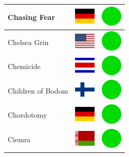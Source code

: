 \documentclass[12pt, a4paper, twoside]{report}
\begin{document}
\begin{center}
\begin{longtable}{|p{5cm}|p{2cm}|p{2cm}|}
 Chasing Fear                                               & \includegraphics[width=1cm]{../img/flags/de} &   \includegraphics[width=1cm]{../likes/y} \\ \hline
 Chelsea Grin                                               & \includegraphics[width=1cm]{../img/flags/us} &   \includegraphics[width=1cm]{../likes/y} \\ \hline
 Chemicide                                                  & \includegraphics[width=1cm]{../img/flags/cr} &   \includegraphics[width=1cm]{../likes/y} \\ \hline
 Children of Bodom                                          & \includegraphics[width=1cm]{../img/flags/fi} &   \includegraphics[width=1cm]{../likes/y} \\ \hline
 Chordotomy                                                 & \includegraphics[width=1cm]{../img/flags/de} &   \includegraphics[width=1cm]{../likes/y} \\ \hline
 Ciemra                                                     & \includegraphics[width=1cm]{../img/flags/by} &   \includegraphics[width=1cm]{../likes/y} \\ \hline

\end{longtable}
\end{center}
\end{document}
